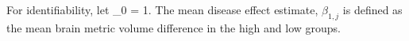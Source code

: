 For identifiability, let \alpha_0 = 1. The mean disease effect estimate, $\beta_{1,j}$ is defined as the mean brain metric volume difference in the high and low groups.